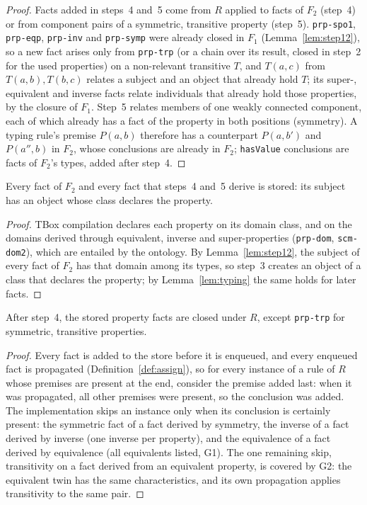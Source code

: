 \begin{proof}
Facts added in steps~4 and~5 come from $R$ applied to facts of $F_2$ (step~4) or from component
pairs of a symmetric, transitive property (step~5). \texttt{prp-spo1}, \texttt{prp-eqp},
\texttt{prp-inv} and \texttt{prp-symp} were already closed in $F_1$ (Lemma~\ref{lem:step12}),
so a new fact arises only from \texttt{prp-trp} (or a chain over its result, closed in step~2 for
the used properties) on a non-relevant transitive $T$, and $T(a,c)$ from $T(a,b),T(b,c)$ relates
a subject and an object that already hold $T$; its super-, equivalent and inverse facts relate
individuals that already hold those properties, by the closure of $F_1$. Step~5 relates members
of one weakly connected component, each of which already has a fact of the property in both
positions (symmetry). A typing rule's premise $P(a,b)$ therefore has a counterpart $P(a,b')$ and
$P(a'',b)$ in $F_2$, whose conclusions are already in $F_2$; \texttt{hasValue} conclusions are
facts of $F_2$'s types, added after step~4.
\end{proof}

\begin{lemma}[Storage]
\label{lem:storage}
Every fact of $F_2$ and every fact that steps~4 and~5 derive is stored: its subject has an object
whose class declares the property.
\end{lemma}

\begin{proof}
TBox compilation declares each property on its domain class, and on the domains derived through
equivalent, inverse and super-properties (\texttt{prp-dom}, \texttt{scm-dom2}), which are entailed
by the ontology. By Lemma~\ref{lem:step12}, the subject of every fact of $F_2$ has that domain
among its types, so step~3 creates an object of a class that declares the property; by
Lemma~\ref{lem:typing} the same holds for later facts.
\end{proof}

\begin{lemma}[Step 4]
\label{lem:step4}
After step~4, the stored property facts are closed under $R$, except \texttt{prp-trp} for
symmetric, transitive properties.
\end{lemma}

\begin{proof}
Every fact is added to the store before it is enqueued, and every enqueued fact is propagated
(Definition~\ref{def:assign}), so for every instance of a rule of $R$ whose premises are present
at the end, consider the premise added last: when it was propagated, all other premises were
present, so the conclusion was added. The implementation skips an instance only when its
conclusion is certainly present: the symmetric fact of a fact derived by symmetry, the inverse
of a fact derived by inverse (one inverse per property), and the equivalence of a fact derived by
equivalence (all equivalents listed, G1). The one remaining skip, transitivity on a fact derived
from an equivalent property, is covered by G2: the equivalent twin has the same characteristics,
and its own propagation applies transitivity to the same pair.
\end{proof}

